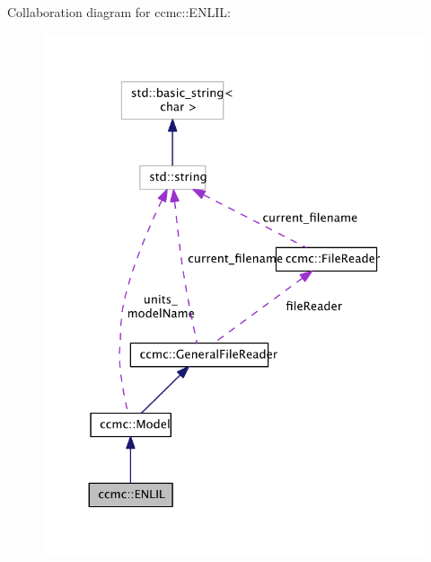 Collaboration diagram for ccmc\-:\-:E\-N\-L\-I\-L\-:\nopagebreak
\begin{figure}[H]
\begin{center}
\leavevmode
\includegraphics[width=326pt]{classccmc_1_1_e_n_l_i_l__coll__graph}
\end{center}
\end{figure}
